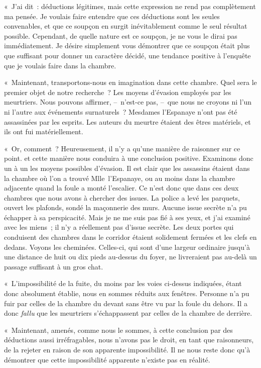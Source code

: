 \documentclass[french,twoside]{book} %
\begin{document}
« J’ai dit : déductions légitimes, mais cette expression ne rend pas complètement ma pensée. Je voulais faire entendre que ces déductions sont les seules convenables, et que ce soupçon en surgit inévitablement comme le seul résultat possible. Cependant, de quelle nature est ce soupçon, je ne vous le dirai pas immédiatement. Je désire simplement vous démontrer que ce soupçon était plus que suffisant pour donner un caractère décidé, une tendance positive à l’enquête que je voulais faire dans la chambre.\par
« Maintenant, transportons-nous en imagination dans cette chambre. Quel sera le premier objet de notre recherche ? Les moyens d’évasion employés par les meurtriers. Nous pouvons affirmer, – n’est-ce pas, – que nous ne croyons ni l’un ni l’autre aux événements surnaturels ? Mesdames l’Espanaye n’ont pas été assassinées par les esprits. Les auteurs du meurtre étaient des êtres matériels, et ils ont fui matériellement.\par
« Or, comment ? Heureusement, il n’y a qu’une manière de raisonner sur ce point. et cette manière nous conduira à une conclusion positive. Examinons donc un à un les moyens possibles d’évasion. Il est clair que les assassins étaient dans la chambre où l’on a trouvé Mlle l’Espanaye, ou au moins dans la chambre adjacente quand la foule a monté l’escalier. Ce n’est donc que dans ces deux chambres que nous avons à chercher des issues. La police a levé les parquets, ouvert les plafonds, sondé la maçonnerie des murs. Aucune issue secrète n’a pu échapper à sa perspicacité. Mais je ne me suis pas fié à ses yeux, et j’ai examiné avec les miens ; il n’y a réellement pas d’issue secrète. Les deux portes qui conduisent des chambres dans le corridor étaient solidement fermées et les clefs en dedans. Voyons les cheminées. Celles-ci, qui sont d’une largeur ordinaire jusqu’à une distance de huit ou dix pieds au-dessus du foyer, ne livreraient pas au-delà un passage suffisant à un gros chat.\par
« L’impossibilité de la fuite, du moins par les voies ci-dessus indiquées, étant donc absolument établie, nous en sommes réduits aux fenêtres. Personne n’a pu fuir par celles de la chambre du devant sans être vu par la foule du dehors. Il a donc \emph{fallu} que les meurtriers s’échappassent par celles de la chambre de derrière.\par
« Maintenant, amenés, comme nous le sommes, à cette conclusion par des déductions aussi irréfragables, nous n’avons pas le droit, en tant que raisonneurs, de la rejeter en raison de son apparente impossibilité. Il ne nous reste donc qu’à démontrer que cette impossibilité apparente n’existe pas en réalité.\par
\end{document}
